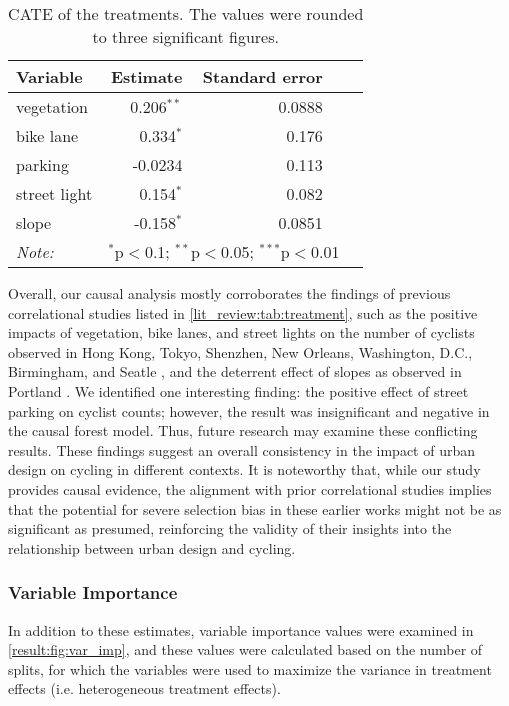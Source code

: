 \documentclass[preprint,12pt, authoryear]{elsarticle}
\begin{document}
\begin{table}[!htp]\centering
\caption{CATE of the treatments. The values were rounded to three significant figures.}\label{result:tab:cf}
\scriptsize
\begin{tabular}{lrrrr}\toprule
Variable&Estimate &Standard error \\ \midrule
vegetation& 0.206$^{**}$ & 0.0888 \\
bike lane& 0.334$^{*}$ & 0.176 \\
parking& -0.0234 & 0.113 \\
street light& 0.154$^{*}$ & 0.082 \\
slope& -0.158$^{*}$ & 0.0851 \\
\bottomrule
\textit{Note:}  & \multicolumn{3}{r}{$^{*}$p$<$0.1; $^{**}$p$<$0.05; $^{***}$p$<$0.01} \\
\end{tabular}
\end{table}

Overall, our causal analysis mostly corroborates the findings of previous correlational studies listed in \autoref{lit_review:tab:treatment}, such as the positive impacts of vegetation, bike lanes, and street lights on the number of cyclists observed in Hong Kong, Tokyo, Shenzhen, New Orleans, Washington, D.C., Birmingham, and Seatle \citep{yang_global_2020, nagata_objective_2020, wang_relationship_2020, parker_installation_2011, goodno_evaluation_2013, uttley_road_2020, chen_gps_2018}, and the deterrent effect of slopes as observed in Portland \citep{broach_where_2012}. We identified one interesting finding: the positive effect of street parking on cyclist counts; however, the result was insignificant and negative in the causal forest model. Thus, future research may examine these conflicting results. These findings suggest an overall consistency in the impact of urban design on cycling in different contexts. It is noteworthy that, while our study provides causal evidence, the alignment with prior correlational studies implies that the potential for severe selection bias in these earlier works might not be as significant as presumed, reinforcing the validity of their insights into the relationship between urban design and cycling.

\subsubsection{Variable Importance}
In addition to these estimates, variable importance values were examined in \autoref{result:fig:var_imp}, and these values were calculated based on the number of splits, for which the variables were used to maximize the variance in treatment effects (i.e. heterogeneous treatment effects).
\end{document}
